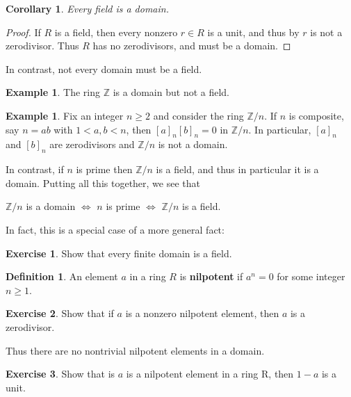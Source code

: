 \documentclass[12pt]{report}
\newtheorem{corollary}[theorem]{Corollary}
\numberwithin{equation}{section}
\numberwithin{theorem}{chapter}
\theoremstyle{definition}
\newtheorem{definition}[theorem]{Definition}
\newtheorem{example}[theorem]{Example}
\newtheorem{exercise}{Exercise}
\newtheorem*{basic properties}{Basic Properties}
\newtheorem*{Important Remark}{Important Remark}
\begin{document}
\begin{corollary}\label{field implies domain}
	Every field is a domain.
\end{corollary}

\begin{proof}
	If $R$ is a field, then every nonzero $r \in R$ is a unit, and thus by  $r$ is not a zerodivisor. Thus $R$ has no zerodivisors, and must be a domain.
\end{proof}

In contrast, not every domain must be a field.


\begin{example}
The ring $\mathbb{Z}$ is a domain but not a field. 
\end{example}
 
\begin{example}
Fix an integer $n \geqslant 2$ and consider the ring $\mathbb{Z}/n$. If $n$ is composite, say $n = ab$ with $1 < a, b < n$, then $[a]_n[b]_n = 0$ in $\mathbb{Z}/n$. In particular, $[a]_n$ and $[b]_n$ are zerodivisors and $\mathbb{Z}/n$ is not a domain.

In contrast, if $n$ is prime then $\mathbb{Z}/n$ is a field, and thus in particular it is a domain. Putting all this together, we see that 

\begin{center}
	$\mathbb{Z}/n$ is a domain $\iff$ $n$ is prime $\iff$ $\mathbb{Z}/n$ is a field.
\end{center}
\end{example}


In fact, this is a special case of a more general fact:

\begin{exercise}
	Show that every finite domain is a field.
\end{exercise}


\begin{definition}
An element $a$ in a ring $R$ is {\bf nilpotent} if $a^n = 0$ for some integer $n \geqslant 1$. 
\end{definition}

\begin{exercise}
	Show that if $a$ is a nonzero nilpotent element, then $a$ is a zerodivisor.
\end{exercise}

Thus there are no nontrivial nilpotent elements in a domain.

\begin{exercise}\label{1-nilpotent is a unit}
Show that is $a$ is a nilpotent element in a ring R, then $1-a$ is a unit.
\end{exercise}
\end{document}
